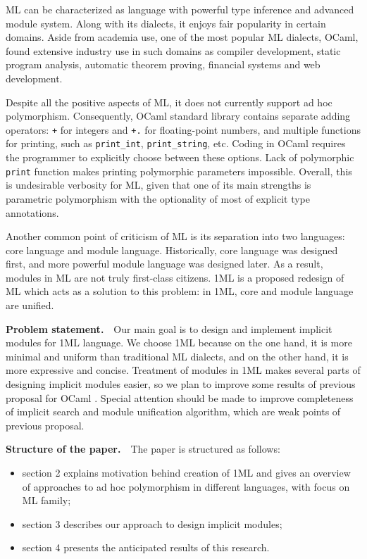 \documentclass{spbau-diploma}
\begin{document}
ML can be characterized as language with powerful type inference and advanced module system. Along with its dialects, it enjoys fair popularity in certain domains. Aside from academia use, one of the most popular ML dialects, OCaml, found extensive industry use in such domains as compiler development, static program analysis, automatic theorem proving, financial systems and web development. 

Despite all the positive aspects of ML, it does not currently support ad hoc polymorphism. Consequently, OCaml standard library contains separate adding operators: \texttt{+} for integers and \texttt{+.} for floating-point numbers, and multiple functions for printing, such as \texttt{print\_int}, \texttt{print\_string}, etc. Coding in OCaml requires the programmer to explicitly choose between these options. Lack of polymorphic \texttt{print} function makes printing polymorphic parameters impossible. Overall, this is undesirable verbosity for ML, given that one of its main strengths is parametric polymorphism with the optionality of most of explicit type annotations.

Another common point of criticism of ML is its separation into two languages: core language and module language. Historically, core language was designed first, and more powerful module language was designed later. As a result, modules in ML are not truly first-class citizens. 1ML \cite{1ml} is a proposed redesign of ML which acts as a solution to this problem: in 1ML, core and module language are unified.

\textbf{Problem statement.}~~Our main goal is to design and implement implicit modules for 1ML language. We choose 1ML because on the one hand, it is more minimal and uniform than traditional ML dialects, and on the other hand, it is more expressive and concise. Treatment of modules in 1ML makes several parts of designing implicit modules easier, so we plan to improve some results of previous proposal for OCaml \cite{white}. Special attention should be made to improve completeness of implicit search and module unification algorithm, which are weak points of previous proposal. 

\textbf{Structure of the paper.}~~The paper is structured as follows:
\begin{itemize}
\item section 2 explains motivation behind creation of 1ML and gives an overview of approaches to ad hoc polymorphism in different languages, with focus on ML family;
\item section 3 describes our approach to design implicit modules;
\item section 4 presents the anticipated results of this research.
\end{itemize}
\end{document}
